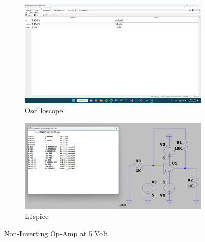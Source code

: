 \documentclass{zc-ust-hw}
\begin{document}
\begin{figure}[htpb]
  \centering
  \begin{subfigure}[b]{0.45\textwidth}
    \includegraphics[width=\textwidth]{figures/non-inv-opamp-5v.png}
    \caption{Oscilloscope}
  \end{subfigure}
  \hfill
  \begin{subfigure}[b]{0.45\textwidth}
    \includegraphics[width=\textwidth]{figures/non-inv-opamp-5v-lts.png}
    \caption{LTspice}
  \end{subfigure}
  \caption{Non-Inverting Op-Amp at 5 Volt}
\end{figure}
\end{document}
